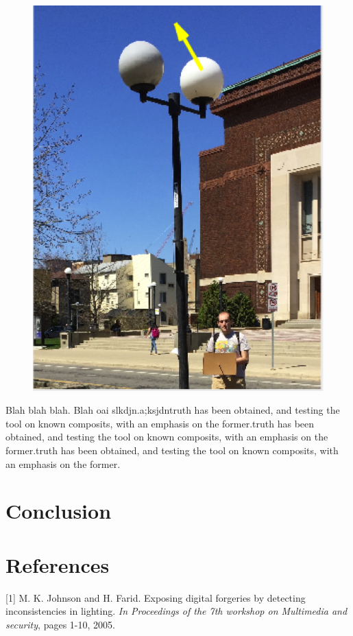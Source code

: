 \documentclass[10pt,twocolumn,letterpaper]{article}
\begin{document}
\begin{figure}[h]
\center
\includegraphics[scale = 0.3]{lamppost.png}
\end{figure}

Blah blah blah. Blah oai slkdjn.a;ksjdntruth has been obtained, and testing the tool on known composits, with an emphasis on the former.truth has been obtained, and testing the tool on known composits, with an emphasis on the former.truth has been obtained, and testing the tool on known composits, with an emphasis on the former.

\section{Conclusion}

\section{References}

[1] M. K. Johnson and H. Farid. Exposing digital forgeries by detecting inconsistencies in lighting. \emph{In Proceedings of the 7th workshop on Multimedia and security}, pages 1-10, 2005.
\end{document}
